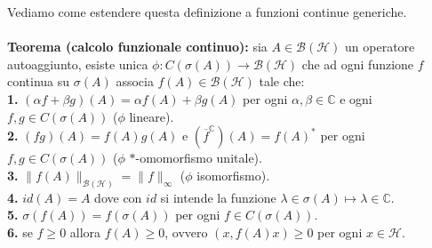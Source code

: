 \documentclass{article}
\numberwithin{equation}{subsection}
\begin{document}
Vediamo come estendere questa definizione a funzioni continue generiche. \\ \\
\textbf{Teorema (calcolo funzionale continuo):} sia $A \in \mathcal{B}(\mathcal{H})$ un operatore autoaggiunto, esiste unica $\phi : C(\sigma(A)) \longrightarrow \mathcal{B}(\mathcal{H})$ che ad ogni funzione $f$ continua su $\sigma(A)$ associa $f(A) \in \mathcal{B}(\mathcal{H})$ tale che: \\
\textbf{1.} $(\alpha f + \beta g)(A) = \alpha f(A) + \beta g(A)$ per ogni $\alpha, \beta \in \mathbb{C}$ e ogni $f, g \in C(\sigma(A))$ ($\phi$ lineare). \\
\textbf{2.} $(fg)(A) = f(A)g(A)$ e $(\overline{f}^{\mathbb{C}})(A) = f(A)^*$ per ogni $f, g \in C(\sigma(A))$ ($\phi$ $*$-omomorfismo unitale). \\
\textbf{3.} $\|f(A)\|_{\mathcal{B}(\mathcal{H})} = \|f\|_{\infty}$ ($\phi$ isomorfismo). \\
\textbf{4.} $id(A) = A$ dove con $id$ si intende la funzione $\lambda \in \sigma(A) \mapsto \lambda \in \mathbb{C}$. \\
\textbf{5.} $\sigma(f(A)) = f(\sigma(A))$ per ogni $f \in C(\sigma(A))$. \\
\textbf{6.} se $f \geq 0$ allora $f(A) \geq 0$, ovvero $(x, f(A)x) \geq 0$ per ogni $x \in \mathcal{H}$. \\
\end{document}
